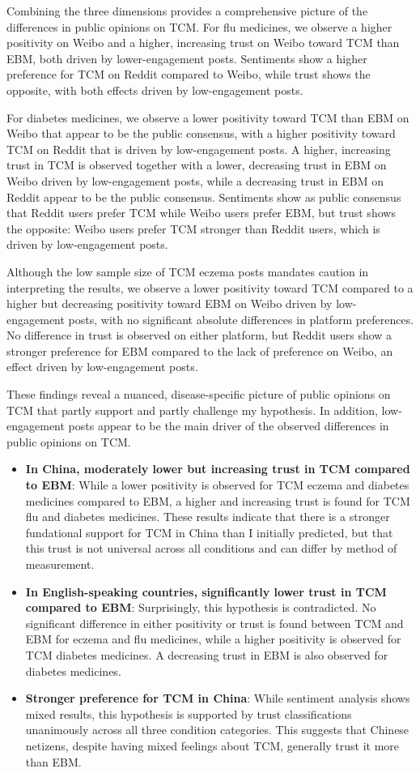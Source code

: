 \documentclass[11pt]{article}
\begin{document}
Combining the three dimensions provides a comprehensive picture of the differences in public opinions on TCM. For flu medicines, we observe a higher positivity on Weibo and a higher, increasing trust on Weibo toward TCM than EBM, both driven by lower-engagement posts. Sentiments show a higher preference for TCM on Reddit compared to Weibo, while trust shows the opposite, with both effects driven by low-engagement posts.

For diabetes medicines, we observe a lower positivity toward TCM than EBM on Weibo that appear to be the public consensus, with a higher positivity toward TCM on Reddit that is driven by low-engagement posts. A higher, increasing trust in TCM is observed together with a lower, decreasing trust in EBM on Weibo driven by low-engagement posts, while a decreasing trust in EBM on Reddit appear to be the public consensus. Sentiments show as public consensus that Reddit users prefer TCM while Weibo users prefer EBM, but trust shows the opposite: Weibo users prefer TCM stronger than Reddit users, which is driven by low-engagement posts.

Although the low sample size of TCM eczema posts mandates caution in interpreting the results, we observe a lower positivity toward TCM compared to a higher but decreasing positivity toward EBM on Weibo driven by low-engagement posts, with no significant absolute differences in platform preferences. No difference in trust is observed on either platform, but Reddit users show a stronger preference for EBM compared to the lack of preference on Weibo, an effect driven by low-engagement posts.

These findings reveal a nuanced, disease-specific picture of public opinions on TCM that partly support and partly challenge my hypothesis. In addition, low-engagement posts appear to be the main driver of the observed differences in public opinions on TCM.
\begin{itemize}
    \item \textbf{In China, moderately lower but increasing trust in TCM compared to EBM}: While a lower positivity is observed for TCM eczema and diabetes medicines compared to EBM, a higher and increasing trust is found for TCM flu and diabetes medicines. These results indicate that there is a stronger fundational support for TCM in China than I initially predicted, but that this trust is not universal across all conditions and can differ by method of measurement.
    \item \textbf{In English-speaking countries, significantly lower trust in TCM compared to EBM}: Surprisingly, this hypothesis is contradicted. No significant difference in either positivity or trust is found between TCM and EBM for eczema and flu medicines, while a higher positivity is observed for TCM diabetes medicines. A decreasing trust in EBM is also observed for diabetes medicines.
    \item \textbf{Stronger preference for TCM in China}: While sentiment analysis shows mixed results, this hypothesis is supported by trust classifications unanimously across all three condition categories. This suggests that Chinese netizens, despite having mixed feelings about TCM, generally trust it more than EBM.
\end{itemize}
\end{document}
